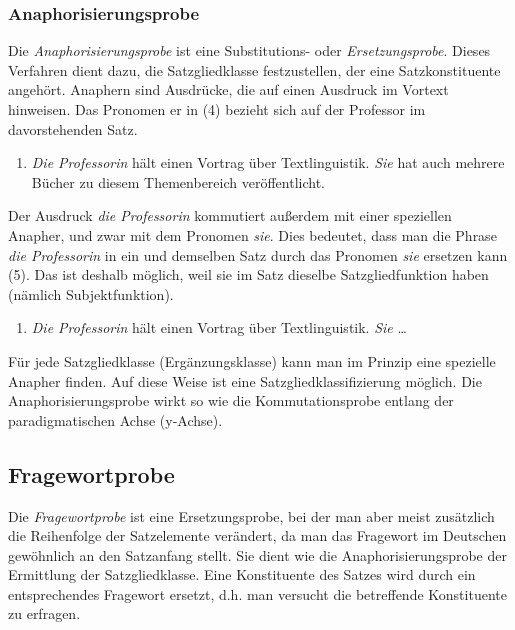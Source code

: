 \documentclass[
  letterpaper,
  DIV=11,
  numbers=noendperiod]{scrreprt}
\providecommand{\tightlist}{%
  \setlength{\itemsep}{0pt}\setlength{\parskip}{0pt}}\usepackage{longtable,booktabs,array}
\begin{document}
\hypertarget{anaphorisierungsprobe}{%
\subsubsection{Anaphorisierungsprobe}\label{anaphorisierungsprobe}}

Die \emph{Anaphorisierungsprobe} ist eine Substitutions- oder
\emph{Ersetzungsprobe}. Dieses Verfahren dient dazu, die Satzgliedklasse
festzustellen, der eine Satzkonstituente angehört. Anaphern sind
Ausdrücke, die auf einen Ausdruck im Vortext hinweisen. Das Pronomen er
in (4) bezieht sich auf der Professor im davorstehenden Satz.

\begin{enumerate}
\def\labelenumi{(\arabic{enumi})}
\setcounter{enumi}{3}
\tightlist
\item
  \emph{Die Professorin} hält einen Vortrag über Textlinguistik.
  \emph{Sie} hat auch mehrere Bücher zu diesem Themenbereich
  veröffentlicht.
\end{enumerate}

Der Ausdruck \emph{die Professorin} kommutiert außerdem mit einer
speziellen Anapher, und zwar mit dem Pronomen \emph{sie}. Dies bedeutet,
dass man die Phrase \emph{die Professorin} in ein und demselben Satz
durch das Pronomen \emph{sie} ersetzen kann (5). Das ist deshalb
möglich, weil sie im Satz dieselbe Satzgliedfunktion haben (nämlich
Subjektfunktion).

\begin{enumerate}
\def\labelenumi{(\arabic{enumi})}
\setcounter{enumi}{4}
\tightlist
\item
  \emph{Die Professorin} hält einen Vortrag über Textlinguistik.
  \emph{Sie} \ldots{}
\end{enumerate}

Für jede Satzgliedklasse (Ergänzungsklasse) kann man im Prinzip eine
spezielle Anapher finden. Auf diese Weise ist eine
Satzgliedklassifizierung möglich. Die Anaphorisierungsprobe wirkt so wie
die Kommutationsprobe entlang der paradigmatischen Achse (y-Achse).

\hypertarget{fragewortprobe}{%
\subsection{Fragewortprobe}\label{fragewortprobe}}

Die \emph{Fragewortprobe} ist eine Ersetzungsprobe, bei der man aber
meist zusätzlich die Reihenfolge der Satzelemente verändert, da man das
Fragewort im Deutschen gewöhnlich an den Satzanfang stellt. Sie dient
wie die Anaphorisierungsprobe der Ermittlung der Satzgliedklasse. Eine
Konstituente des Satzes wird durch ein entsprechendes Fragewort ersetzt,
d.h. man versucht die betreffende Konstituente zu erfragen.
\end{document}
